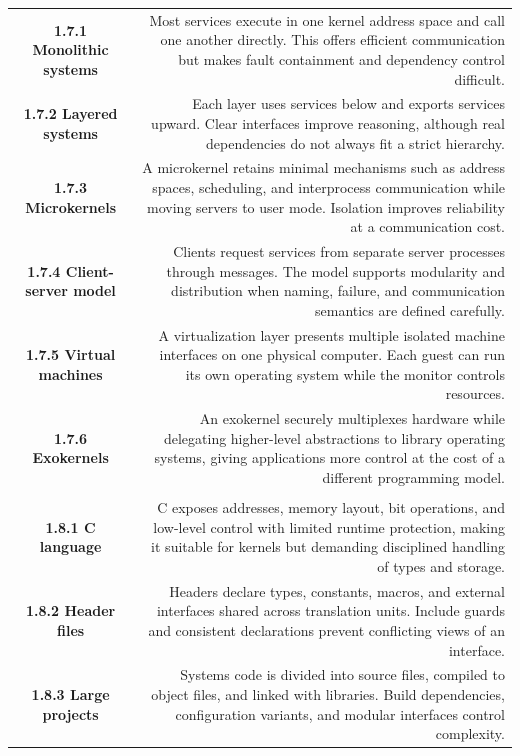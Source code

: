 \documentclass[10pt,letterpaper]{article}
\begin{document}
\begin{longtable}{C N}
\\*\hline
\textbf{1.7.1 Monolithic systems} & Most services execute in one kernel address space and call one another directly. This offers efficient communication but makes fault containment and dependency control difficult.\\\hline
\textbf{1.7.2 Layered systems} & Each layer uses services below and exports services upward. Clear interfaces improve reasoning, although real dependencies do not always fit a strict hierarchy.\\\hline
\textbf{1.7.3 Microkernels} & A microkernel retains minimal mechanisms such as address spaces, scheduling, and interprocess communication while moving servers to user mode. Isolation improves reliability at a communication cost.\\\hline
\textbf{1.7.4 Client-server model} & Clients request services from separate server processes through messages. The model supports modularity and distribution when naming, failure, and communication semantics are defined carefully.\\\hline
\textbf{1.7.5 Virtual machines} & A virtualization layer presents multiple isolated machine interfaces on one physical computer. Each guest can run its own operating system while the monitor controls resources.\\\hline
\textbf{1.7.6 Exokernels} & An exokernel securely multiplexes hardware while delegating higher-level abstractions to library operating systems, giving applications more control at the cost of a different programming model.\\\hline
{}\\*\hline
\textbf{1.8.1 C language} & C exposes addresses, memory layout, bit operations, and low-level control with limited runtime protection, making it suitable for kernels but demanding disciplined handling of types and storage.\\\hline
\textbf{1.8.2 Header files} & Headers declare types, constants, macros, and external interfaces shared across translation units. Include guards and consistent declarations prevent conflicting views of an interface.\\\hline
\textbf{1.8.3 Large projects} & Systems code is divided into source files, compiled to object files, and linked with libraries. Build dependencies, configuration variants, and modular interfaces control complexity.\\\hline

\end{longtable}
\end{document}
